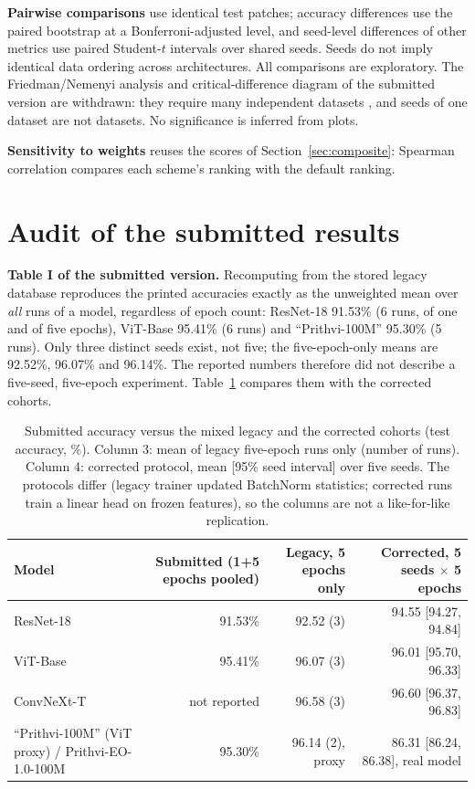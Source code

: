 \documentclass[3p,times,procedia]{elsarticle}
\begin{document}
\textbf{Pairwise comparisons} use identical test patches; accuracy differences use the paired bootstrap at a Bonferroni-adjusted level, and seed-level differences of other metrics use paired Student-$t$ intervals over shared seeds. Seeds do not imply identical data ordering across architectures. All comparisons are exploratory. The Friedman/Nemenyi analysis and critical-difference diagram of the submitted version are withdrawn: they require many independent datasets \cite{statistics}, and seeds of one dataset are not datasets. No significance is inferred from plots.

\textbf{Sensitivity to weights} reuses the scores of Section~\ref{sec:composite}: Spearman correlation compares each scheme's ranking with the default ranking.

\section{Audit of the submitted results}\label{sec:discrepancy}
\textbf{Table I of the submitted version.} Recomputing from the stored legacy database reproduces the printed accuracies exactly as the unweighted mean over \emph{all} runs of a model, regardless of epoch count: ResNet-18 91.53\% (6 runs, of one and of five epochs), ViT-Base 95.41\% (6 runs) and ``Prithvi-100M'' 95.30\% (5 runs). Only three distinct seeds exist, not five; the five-epoch-only means are 92.52\%, 96.07\% and 96.14\%. The reported numbers therefore did not describe a five-seed, five-epoch experiment. Table~\ref{tab:legacy} compares them with the corrected cohorts.

\begin{table}[htbp]\centering\footnotesize\setlength{\tabcolsep}{3pt}\caption{Submitted accuracy versus the mixed legacy and the corrected cohorts (test accuracy, \%). Column 3: mean of legacy five-epoch runs only (number of runs). Column 4: corrected protocol, mean [95\% seed interval] over five seeds. The protocols differ (legacy trainer updated BatchNorm statistics; corrected runs train a linear head on frozen features), so the columns are not a like-for-like replication.}\label{tab:legacy}\begin{tabular}{p{.3\linewidth}rrr}\toprule Model & Submitted (1+5 epochs pooled) & Legacy, 5 epochs only & Corrected, 5 seeds $\times$ 5 epochs\\\midrule ResNet-18 & 91.53\% & 92.52 (3) & 94.55 [94.27, 94.84] \\ ViT-Base & 95.41\% & 96.07 (3) & 96.01 [95.70, 96.33] \\ ConvNeXt-T & not reported & 96.58 (3) & 96.60 [96.37, 96.83] \\ ``Prithvi-100M'' (ViT proxy) / Prithvi-EO-1.0-100M & 95.30\% & 96.14 (2), proxy & 86.31 [86.24, 86.38], real model \\\bottomrule\end{tabular}\end{table}
\end{document}
